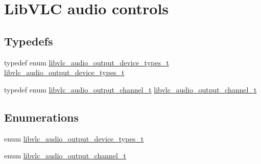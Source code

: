 \hypertarget{group__libvlc__audio}{}\section{Lib\+V\+LC audio controls}
\label{group__libvlc__audio}
\subsection*{Typedefs}
\begin{DoxyCompactItemize}
\item 
typedef enum \hyperlink{group__libvlc__audio_ga588fc66806ea8599a17ab92c455c3cf2}{libvlc\+\_\+audio\+\_\+output\+\_\+device\+\_\+types\+\_\+t} \hyperlink{group__libvlc__audio_ga059f2f96f5c47f3b7878e21b4d879613}{libvlc\+\_\+audio\+\_\+output\+\_\+device\+\_\+types\+\_\+t}
\item 
typedef enum \hyperlink{group__libvlc__audio_ga50e752d67eaa2738e0f914805b1b3a05}{libvlc\+\_\+audio\+\_\+output\+\_\+channel\+\_\+t} \hyperlink{group__libvlc__audio_ga7f84a7c868f1111778ef7e9e30bc3690}{libvlc\+\_\+audio\+\_\+output\+\_\+channel\+\_\+t}
\end{DoxyCompactItemize}
\subsection*{Enumerations}
\begin{DoxyCompactItemize}
\item 
enum \hyperlink{group__libvlc__audio_ga588fc66806ea8599a17ab92c455c3cf2}{libvlc\+\_\+audio\+\_\+output\+\_\+device\+\_\+types\+\_\+t} 
\item 
enum \hyperlink{group__libvlc__audio_ga50e752d67eaa2738e0f914805b1b3a05}{libvlc\+\_\+audio\+\_\+output\+\_\+channel\+\_\+t} 
\end{DoxyCompactItemize}
